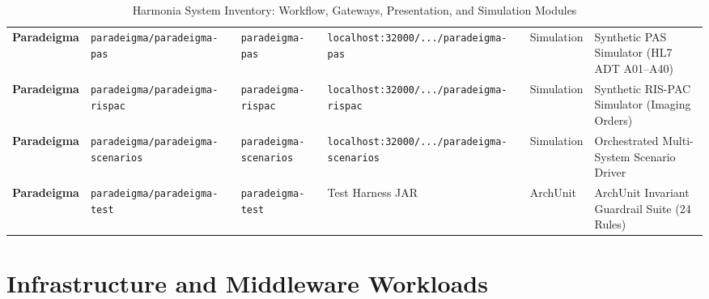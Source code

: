 \begin{table}[htbp]
\begin{tabularx}{\textwidth}{l P{2.5cm} P{2.0cm} P{3.2cm} P{1.8cm} Y}
\textbf{Paradeigma} & \nolinkurl{paradeigma/paradeigma-pas} & \texttt{paradeigma-pas} & \nolinkurl{localhost:32000/.../paradeigma-pas} & Simulation & Synthetic PAS Simulator (HL7 ADT A01--A40) \\
\textbf{Paradeigma} & \nolinkurl{paradeigma/paradeigma-rispac} & \texttt{paradeigma-rispac} & \nolinkurl{localhost:32000/.../paradeigma-rispac} & Simulation & Synthetic RIS-PAC Simulator (Imaging Orders) \\
\textbf{Paradeigma} & \nolinkurl{paradeigma/paradeigma-scenarios} & \texttt{paradeigma-scenarios} & \nolinkurl{localhost:32000/.../paradeigma-scenarios} & Simulation & Orchestrated Multi-System Scenario Driver \\
\textbf{Paradeigma} & \nolinkurl{paradeigma/paradeigma-test} & \texttt{paradeigma-test} & Test Harness JAR & ArchUnit & ArchUnit Invariant Guardrail Suite (24 Rules) \\
\bottomrule
\end{tabularx}
\caption{Harmonia System Inventory: Workflow, Gateways, Presentation, and Simulation Modules}
\label{tab:system_inventory_applications}
\end{table}

\newpage
\section{Infrastructure and Middleware Workloads}

